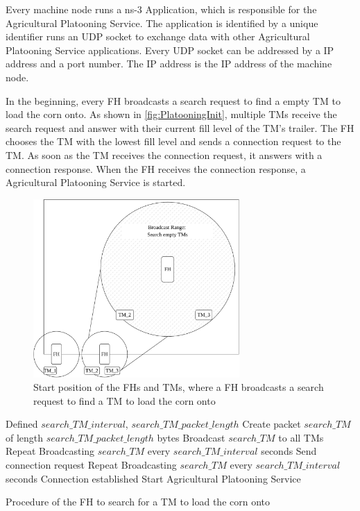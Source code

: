 Every machine node runs a ns-3 Application, which is responsible for the Agricultural Platooning Service.
The application is identified by a unique identifier runs an UDP socket to exchange data with other Agricultural Platooning Service applications.
Every UDP socket can be addressed by a IP address and a port number.
The IP address is the IP address of the machine node.

In the beginning, every \ac{FH} broadcasts a search request to find a empty \ac{TM} to load the corn onto.
As shown in \autoref{fig:PlatooningInit}, multiple \ac{TM}s receive the search request and answer with
their current fill level of the \ac{TM}'s trailer.
The \ac{FH} chooses the \ac{TM} with the lowest fill level and sends a connection request to the \ac{TM}.
As soon as the \ac{TM} receives the connection request, it answers with a connection response.
When the \ac{FH} receives the connection response, a Agricultural Platooning Service is started.
\begin{figure}[H]%
	\centering
	\includegraphics[width=0.7\textwidth]{figures/platoonINIT}
	\caption{Start position of the \acf{FH}s and \acf{TM}s, where a \ac{FH} broadcasts a search request to find
	a \ac{TM} to load the corn onto}
	\label{fig:PlatooningInit}%
\end{figure}

\begin{algorithm}
\begin{algorithmic}[1]
\REQUIRE Defined $search\_TM\_interval$, $search\_TM\_packet\_length$
\STATE Create packet $search\_TM$ of length $search\_TM\_packet\_length$ bytes
\STATE Broadcast $search\_TM$ to all \acs{TM}s
    \STATE Repeat Broadcasting $search\_TM$ every $search\_TM\_interval$ seconds
\ELSE
	\STATE Send connection request
		\STATE Repeat Broadcasting $search\_TM$ every $search\_TM\_interval$ seconds
	\ELSE
		\STATE Connection established
		\STATE Start Agricultural Platooning Service
	\ENDIF
\ENDIF
\end{algorithmic}
\caption{Procedure of the \acf{FH} to search for a \acf{TM} to load the corn onto}
\label{alg:SearchTM}
\end{algorithm}

